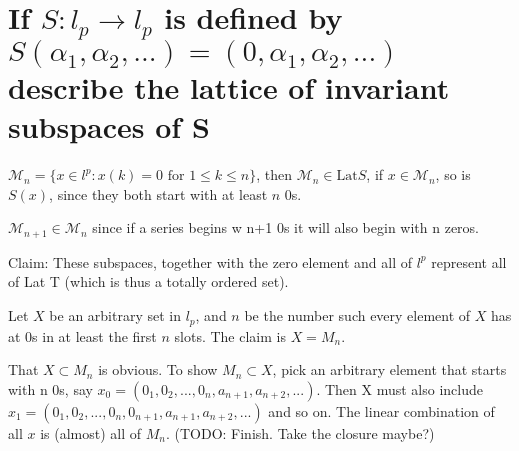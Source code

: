 \documentclass{article}
\begin{document}
\section{If $S:l_p \to l_p$ is defined by $S(\alpha_1, \alpha_2, ...) =(0, \alpha_1, \alpha_2, ...)$ describe the lattice of invariant subspaces of S}

$\mathscr{M}_n=\{x\in l^p:x(k)=0 \text{ for } 1 \le k \le n\}$, then $\mathscr{M}_n \in \text{Lat}S$, if $x \in \mathscr{M}_n$, so is $S(x)$, since they both start with at least $n$ 0s.

$\mathscr{M}_{n+1} \in \mathscr{M}_n$ since if a series begins w n+1 0s it will also begin with n zeros.

Claim: These subspaces, together with the zero element and all of $l^p$ represent all of Lat T (which is thus a totally ordered set).

Let $X$ be an arbitrary set in $l_p$, and $n$ be the number such every element of $X$ has at 0s in at least the first $n$ slots. The claim is $X = M_n$. 

That $X \subset M_n$ is obvious. To show $M_n \subset X$, pick an arbitrary element that starts with n 0s, say $x_0=(0_1, 0_2, ... , 0_n, a_{n+1}, a_{n+2},...)$.  Then X must also include $x_1=(0_1, 0_2, ..., 0_n, 0_{n+1}, a_{n+1}, a_{n+2},...)$ and so on. The linear combination of all $x$ is (almost) all of $M_n$. (TODO: Finish. Take the closure maybe?)
\end{document}
